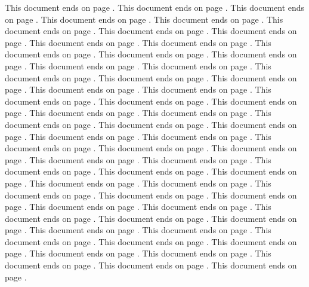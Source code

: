 \documentclass[a4paper]{article}
\begin{document}
This document ends on page \pageref{docend}.
This document ends on page \pageref{docend}.
This document ends on page \pageref{docend}.
This document ends on page \pageref{docend}.
This document ends on page \pageref{docend}.
This document ends on page \pageref{docend}.
This document ends on page \pageref{docend}.
This document ends on page \pageref{docend}.
This document ends on page \pageref{docend}.
This document ends on page \pageref{docend}.
This document ends on page \pageref{docend}.
This document ends on page \pageref{docend}.
This document ends on page \pageref{docend}.
This document ends on page \pageref{docend}.
This document ends on page \pageref{docend}.
This document ends on page \pageref{docend}.
This document ends on page \pageref{docend}.
This document ends on page \pageref{docend}.
This document ends on page \pageref{docend}.
This document ends on page \pageref{docend}.
This document ends on page \pageref{docend}.
This document ends on page \pageref{docend}.
This document ends on page \pageref{docend}.
This document ends on page \pageref{docend}.
This document ends on page \pageref{docend}.
This document ends on page \pageref{docend}.
This document ends on page \pageref{docend}.
This document ends on page \pageref{docend}.
This document ends on page \pageref{docend}.
This document ends on page \pageref{docend}.
This document ends on page \pageref{docend}.
This document ends on page \pageref{docend}.
This document ends on page \pageref{docend}.
This document ends on page \pageref{docend}.
This document ends on page \pageref{docend}.
This document ends on page \pageref{docend}.
This document ends on page \pageref{docend}.
This document ends on page \pageref{docend}.
This document ends on page \pageref{docend}.
This document ends on page \pageref{docend}.
This document ends on page \pageref{docend}.
This document ends on page \pageref{docend}.
This document ends on page \pageref{docend}.
This document ends on page \pageref{docend}.
This document ends on page \pageref{docend}.
This document ends on page \pageref{docend}.
This document ends on page \pageref{docend}.
This document ends on page \pageref{docend}.
This document ends on page \pageref{docend}.
This document ends on page \pageref{docend}.
This document ends on page \pageref{docend}.
This document ends on page \pageref{docend}.
This document ends on page \pageref{docend}.
This document ends on page \pageref{docend}.
This document ends on page \pageref{docend}.
This document ends on page \pageref{docend}.
This document ends on page \pageref{docend}.
This document ends on page \pageref{docend}.
\end{document}
